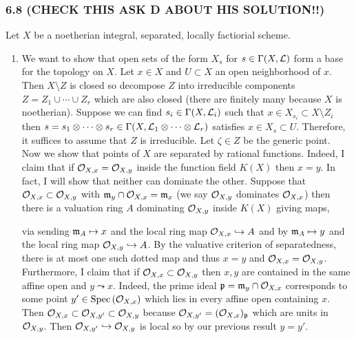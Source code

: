 \documentclass[12pt]{article}
\begin{document}
\subsubsection{6.8 (CHECK THIS ASK D ABOUT HIS SOLUTION!!)}

Let $X$ be a noetherian integral, separated, locally factiorial scheme.

\begin{enumerate}
\item We want to show that open sets of the form $X_s$ for $s \in \Gamma(X, \mathcal{L})$ form a base for the topology on $X$. Let $x \in X$ and $U \subset X$ an open neighborhood of $x$. Then $X \setminus Z$ is closed so decompose $Z$ into irreducible components $Z = Z_1 \cup \cdots \cup Z_r$ which are also closed (there are finitely many because $X$ is noetherian). Suppose we can find $s_i \in \Gamma(X, \mathcal{L}_i)$ such that $x \in X_{s_i} \subset X \setminus Z_i$ then $s = s_1 \otimes \cdots \otimes s_r \in \Gamma(X, \mathcal{L}_1 \otimes \cdots \otimes \mathcal{L}_r)$ satisfies $x \in X_s \subset U$. Therefore, it suffices to assume that $Z$ is irreducible. Let $\zeta \in Z$ be the generic point.
\bigskip\\
Now we show that points of $X$ are separated by rational functions. Indeed, I claim that if $\mathcal{O}_{X, x} = \mathcal{O}_{X, y}$ inside the function field $K(X)$ then $x = y$. In fact, I will show that neither can dominate the other. Suppose that $\mathcal{O}_{X, x} \subset \mathcal{O}_{X, y}$ with $\mathfrak{m}_y \cap \mathcal{O}_{X, x} = \mathfrak{m}_x$ (we say $\mathcal{O}_{X, y}$ dominates $\mathcal{O}_{X, x}$) then there is a valuation ring $A$ dominating $\mathcal{O}_{X, y}$ inside $K(X)$ giving maps,
\begin{center}
\end{center}
via sending $\mathfrak{m}_A \mapsto x$ and the local ring map $\mathcal{O}_{X, x} \hookrightarrow A$ and by $\mathfrak{m}_A \mapsto y$ and the local ring map $\mathcal{O}_{X, y} \hookrightarrow A$. By the valuative criterion of separatedness, there is at most one such dotted map and thus $x = y$ and $\mathcal{O}_{X, x} = \mathcal{O}_{X, y}$.
\bigskip\\
Furthermore, I claim that if $\mathcal{O}_{X, x} \subset \mathcal{O}_{X, y}$ then $x,y$ are contained in the same affine open and $y \leadsto x$. Indeed, the prime ideal $\mathfrak{p} = \mathfrak{m}_y \cap \mathcal{O}_{X, x}$ corresponds to some point $y' \in \mathrm{Spec}\left( \mathcal{O}_{X, x} \right)$ which lies in every affine open containing $x$. Then $\mathcal{O}_{X, x} \subset \mathcal{O}_{X, y'} \subset \mathcal{O}_{X, y}$ because $\mathcal{O}_{X, y'} = (\mathcal{O}_{X, x})_{\mathfrak{p}}$ which are units in $\mathcal{O}_{X, y}$. Then $\mathcal{O}_{X, y'} \hookrightarrow \mathcal{O}_{X, y}$ is local so by our previous result $y = y'$.

\end{enumerate}
\end{document}
